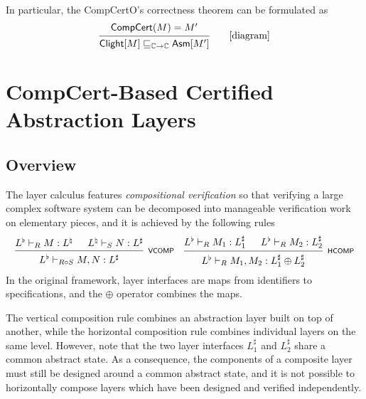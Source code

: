 \documentclass[acmsmall,review,anonymous]{acmart}\settopmatter{printfolios=true,printccs=false,printacmref=false}
\begin{document}
In particular, the CompCertO's correctness theorem can be formulated as
\[
  \begin{prooftree}
    \hypo{\kw{CompCert}(M) = M'}
    \infer1{
      \kw{Clight}[M]
      \sqsubseteq_{\mathbb{C} \rightarrow \mathbb{C}}
      \kw{Asm}[M']}
  \end{prooftree}
  \qquad
  \mbox{[diagram]}
\]


\section{CompCert-Based Certified Abstraction Layers} \label{sec:compcert-cal} %



\subsection{Overview} %


The layer calculus features \emph{compositional verification}
so that verifying a large complex software system
can be decomposed into
manageable verification work
on elementary pieces,
and it is achieved by the following rules
\[
  \begin{prooftree}
    \hypo{L^\flat \vdash_R M : L^\natural}
    \hypo{L^\natural \vdash_S N : L^\sharp}
    \infer2[\scriptsize\kw{VCOMP}]{L^\flat \vdash_{R \circ S} M, N : L^\sharp}
  \end{prooftree}
  \quad
  \begin{prooftree}
    \hypo{L^\flat \vdash_R M_1 : L_1^\sharp}
    \hypo{L^\flat \vdash_R M_2 : L_2^\sharp}
    \infer2[\scriptsize\kw{HCOMP}]{L^\flat \vdash_R M_1, M_2 :
      L_1^\sharp \oplus L_2^\sharp}
  \end{prooftree}
\]
In the original framework,
layer interfaces are maps from identifiers to
specifications,
and the $\oplus$ operator combines the maps.

The vertical composition rule
combines an abstraction layer built on top of another,
while the horizontal composition rule combines
individual layers on the same level.
However, note that the two layer interfaces
$L_1^\sharp$ and $L_2^\sharp$
share a common abstract state.
As a consequence, 
the components of a composite layer
must still be designed around a common abstract state,
and it is not possible to horizontally compose layers
which have been designed and verified independently.
\end{document}
